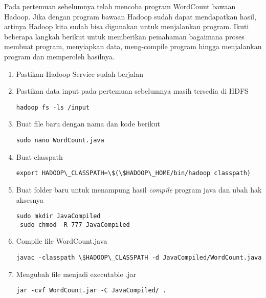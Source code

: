\documentclass[a4paper]{tufte-handout}
\begin{document}

Pada pertemuan sebelumnya telah mencoba program WordCount bawaan Hadoop. Jika dengan program bawaan Hadoop sudah dapat mendapatkan hasil, artinya Hadoop kita sudah bisa digunakan untuk menjalankan program. Ikuti beberapa langkah berikut untuk memberikan pemahaman bagaimana proses membuat program, menyiapkan data, meng-compile program hingga menjalankan program dan memperoleh hasilnya.

\begin{enumerate}
\item Pastikan Hadoop Service sudah berjalan
\item Pastikan data input pada pertemuan sebelumnya masih tersedia di HDFS
\begin{lstlisting}[language=Terminal]
 hadoop fs -ls /input
\end{lstlisting}

\item Buat file baru dengan nama dan kode berikut
\begin{lstlisting}[language=Terminal]
 sudo nano WordCount.java
\end{lstlisting} 


\item Buat classpath
\begin{lstlisting}[language=Terminal]
 export HADOOP\_CLASSPATH=\$(\$HADOOP\_HOME/bin/hadoop classpath)
\end{lstlisting} 

\item Buat folder baru untuk menampung hasil \textit{compile} program java dan ubah hak aksesnya
\begin{lstlisting}[language=Terminal]
 sudo mkdir JavaCompiled
 sudo chmod -R 777 JavaCompiled
\end{lstlisting}

\item Compile file WordCount.java
\begin{lstlisting}[language=Terminal]
 javac -classpath \$HADOOP\_CLASSPATH -d JavaCompiled/WordCount.java
\end{lstlisting}

\item Mengubah file menjadi executable .jar
\begin{lstlisting}[language=Terminal]
 jar -cvf WordCount.jar -C JavaCompiled/ .
\end{lstlisting}


\end{enumerate}
\end{document}
